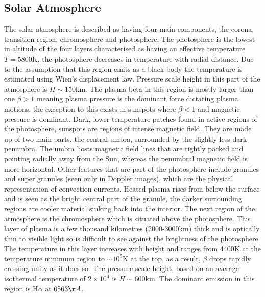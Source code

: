\documentclass[11pt]{article}
\begin{document}
\subsection{Solar Atmosphere}\label{ATM}
The solar atmosphere \citep{2003dysu.book.....D, 2004soas.book.....F} is described as having four main components, the corona, transition region, chromosphere and photosphere. The photosphere is the lowest in altitude of the four layers characterised as having an effective temperature $T=5800$K, the photosphere decreases in temperature with radial distance. Due to the assumption that this region emits as a black body the temperature is estimated using Wien's displacement law. Pressure scale height in this part of the atmosphere is $H\sim150$km. The plasma beta in this region is mostly larger than one $\beta >1$ meaning plasma pressure is the dominant force dictating plasma motions, the exception to this exists in sunspots where $\beta<1$ and magnetic pressure is dominant. Dark, lower temperature patches found in active regions of the photosphere, sunspots are regions of intense magnetic field. They are made up of two main parts, the central umbra, surrounded by the slightly less dark penumbra. The umbra hosts magnetic field lines that are tightly packed and pointing radially away from the Sun, whereas the penumbral magnetic field is more horizontal. Other features that are part of the photosphere include granules and super granules (seen only in Doppler images), which are the physical representation of convection currents. Heated plasma rises from below the surface and is seen as the bright central part of the granule, the darker surrounding regions are cooler material sinking back into the interior. The next region of the atmosphere is the chromosphere which is situated above the photosphere. This layer of plasma is a few thousand kilometres (2000-3000km) thick and is optically thin to visible light so is difficult to see against the brightness of the photosphere. The temperature in this layer increases with height and ranges from 4400K at the temperature minimum region to $\sim10^{5}$K at the top, as a result, $\beta$ drops rapidly crossing unity as it does so. The pressure scale height, based on an average isothermal temperature of $2\times10^{4}$ is $H\sim600$km. The dominant emission in this region is H$\alpha$ at $6563\AA$.
\end{document}
